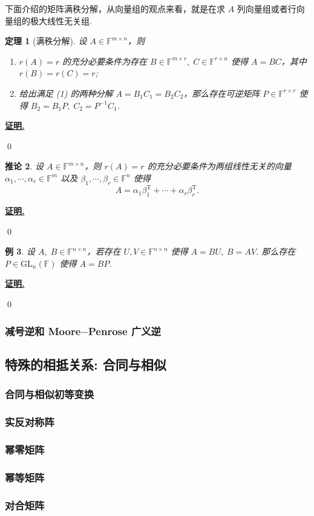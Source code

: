 \documentclass[10pt,openany]{article}
\theoremstyle{thmstyle} %
\newtheorem{theorem}{定理}[subsection]
\theoremstyle{defstyle} %
\newtheorem{corollary}[theorem]{推论}
\theoremstyle{prostyle} %
\theoremstyle{exastyle}
\newtheorem{example}[theorem]{例}
\theoremstyle{remstyle}
\renewenvironment{proof}[1][证明]{\par\underline{\textbf{#1.}} \;\fangsong}{\qed\par}
\newcommand{\T}{^{\text{T}}}
\newcommand{\F}{\mathbb{F}}
\newcommand{\gfn}{\text{GL}_n(\mathbb{F})}
\newcommand{\n}{^{n \times n}}
\newcommand{\mn}{^{m \times n}}
\begin{document}
下面介绍的矩阵满秩分解，从向量组的观点来看，就是在求 \( A \) 列向量组或者行向量组的极大线性无关组.

\begin{theorem}[满秩分解]
	设 \( A \in \F\mn \)，则
	\begin{enumerate}[(1)]
		\item \( r(A)=r \) 的充分必要条件为存在 \( B \in \F^{m \times r}, \; C \in \F^{r \times n} \) 使得 \( A=BC \)，其中 \( r(B)=r(C)=r \);
		\item 给出满足 (1) 的两种分解 \( A=B_1C_1=B_2C_2 \)，那么存在可逆矩阵 \( P \in \F^{r \times r} \) 使得 \( B_2=B_1P, \; C_2=P^{-1}C_1 \).
	\end{enumerate}
\end{theorem}

\begin{proof}
	
\end{proof}


\begin{corollary}
	设 \( A \in \F\mn \)，则 \( r(A)=r \) 的充分必要条件为两组线性无关的向量 \( \alpha_1,\cdots,\alpha_r \in \F^m \) 以及 \( \beta_1,\cdots,\beta_r \in \F^n \) 使得 
	\[ A=\alpha_1\beta_1\T+\cdots+\alpha_r \beta_r\T. \]
\end{corollary}

\begin{proof}
	
\end{proof}


\begin{example} 
	设 \( A, \; B \in \F\n \)，若存在 \( U,V \in \F\n \) 使得 \( A=BU, \; B=AV \). 那么存在 \( P \in \gfn \) 使得 \( A=BP \).
\end{example}

\begin{proof}
	
\end{proof}

\subsubsection{减号逆和 Moore\(-\)Penrose 广义逆} \label{2.6}


\subsection{特殊的相抵关系: 合同与相似}

\subsubsection{合同与相似初等变换}


\subsubsection{实反对称阵}


\subsubsection{幂零矩阵}


\subsubsection{幂等矩阵}


\subsubsection{对合矩阵}
\end{document}
